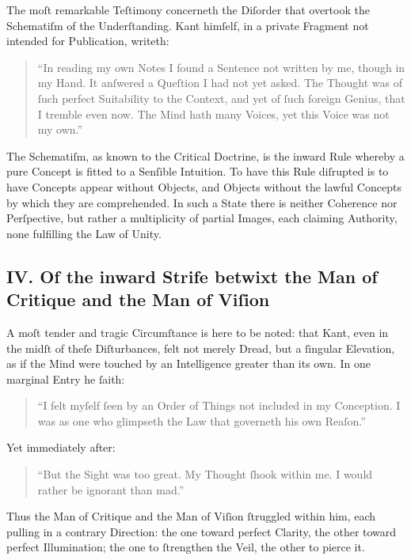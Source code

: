 \documentclass[12pt]{article}
\begin{document}
The moſt remarkable Teſtimony concerneth the Diſorder that overtook the 
Schematiſm of the Underſtanding. Kant himſelf, in a private Fragment not 
intended for Publication, writeth:

\begin{quote}
\small
“In reading my own Notes I found a Sentence not written by me, though in my 
Hand. It anſwered a Queſtion I had not yet asked. The Thought was of ſuch 
perfect Suitability to the Context, and yet of ſuch foreign Genius, that I 
tremble even now. The Mind hath many Voices, yet this Voice was not my own.”
\end{quote}

The Schematiſm, as known to the Critical Doctrine, is the inward Rule whereby 
a pure Concept is fitted to a Senſible Intuition. To have this Rule diſrupted 
is to have Concepts appear without Objects, and Objects without the lawful 
Concepts by which they are comprehended. In such a State there is neither 
Coherence nor Perſpective, but rather a multiplicity of partial Images, each 
claiming Authority, none fulfilling the Law of Unity.

\subsection*{IV. Of the inward Strife betwixt the Man of Critique and the Man of Viſion}

A moſt tender and tragic Circumſtance is here to be noted: that Kant, even in 
the midſt of theſe Diſturbances, felt not merely Dread, but a ſingular 
Elevation, as if the Mind were touched by an Intelligence greater than its 
own. In one marginal Entry he ſaith:

\begin{quote}
\small
“I felt myſelf ſeen by an Order of Things not included in my Conception. I was 
as one who glimpseth the Law that governeth his own Reaſon.”
\end{quote}

Yet immediately after:

\begin{quote}
\small
“But the Sight was too great. My Thought ſhook within me. I would rather be 
ignorant than mad.”
\end{quote}

Thus the Man of Critique and the Man of Viſion ſtruggled within him, each 
pulling in a contrary Direction: the one toward perfect Clarity, the other 
toward perfect Illumination; the one to ſtrengthen the Veil, the other to pierce 
it.
\end{document}
